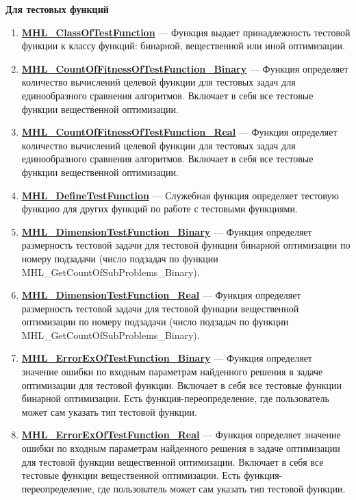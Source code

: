 \documentclass[a4paper,12pt]{article}
\begin{document}
\textbf{Для тестовых функций}
\begin{enumerate}

\item \textbf{\hyperref[MHL_ClassOfTestFunction]{MHL\_ClassOfTestFunction}} --- Функция выдает принадлежность тестовой функции к классу функций: бинарной, вещественной или иной оптимизации.

\item \textbf{\hyperref[MHL_CountOfFitnessOfTestFunction_Binary]{MHL\_CountOfFitnessOfTestFunction\_Binary}} --- Функция определяет количество вычислений целевой функции для тестовых задач для единообразного сравнения алгоритмов. Включает в себя все тестовые функции вещественной оптимизации.

\item \textbf{\hyperref[MHL_CountOfFitnessOfTestFunction_Real]{MHL\_CountOfFitnessOfTestFunction\_Real}} --- Функция определяет количество вычислений целевой функции для тестовых задач для единообразного сравнения алгоритмов. Включает в себя все тестовые функции вещественной оптимизации.

\item \textbf{\hyperref[MHL_DefineTestFunction]{MHL\_DefineTestFunction}} --- Служебная функция определяет тестовую функцию для других функций по работе с тестовыми функциями.

\item \textbf{\hyperref[MHL_DimensionTestFunction_Binary]{MHL\_DimensionTestFunction\_Binary}} --- Функция определяет размерность тестовой задачи для тестовой функции бинарной оптимизации по номеру подзадачи (число подзадач по функции MHL\_GetCountOfSubProblems\_Binary).

\item \textbf{\hyperref[MHL_DimensionTestFunction_Real]{MHL\_DimensionTestFunction\_Real}} --- Функция определяет размерность тестовой задачи для тестовой функции вещественной оптимизации по номеру подзадачи (число подзадач по функции MHL\_GetCountOfSubProblems\_Binary).

\item \textbf{\hyperref[MHL_ErrorExOfTestFunction_Binary]{MHL\_ErrorExOfTestFunction\_Binary}} --- Функция определяет значение ошибки по входным параметрам найденного решения в задаче оптимизации для тестовой функции. Включает в себя все тестовые функции бинарной оптимизации. Есть функция-переопределение, где пользователь может сам указать тип тестовой функции.

\item \textbf{\hyperref[MHL_ErrorExOfTestFunction_Real]{MHL\_ErrorExOfTestFunction\_Real}} --- Функция определяет значение ошибки по входным параметрам найденного решения в задаче оптимизации для тестовой функции вещественной оптимизации. Включает в себя все тестовые функции вещественной оптимизации. Есть функция-переопределение, где пользователь может сам указать тип тестовой функции.


\end{enumerate}
\end{document}
